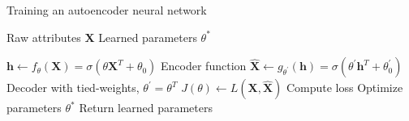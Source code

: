 %
%
%
%
%

\begin{algorithm}
    \caption{Training an autoencoder neural network}
    \label{algo:autoenc}
    \begin{algorithmic}[1]
    
    \INPUT Raw attributes $\mathbf{X}$
    \OUTPUT Learned parameters $\theta^{\ast}$

    \item[]
        \State $\mathbf{h} \gets f_{\theta}(\mathbf{X}) = \sigma(\theta\mathbf{X}^{T} + \theta_0)$
        \Comment Encoder function
        \State $\mathbf{\widehat{X}} \gets g_{\theta^{\prime}}(\mathbf{h}) = \sigma(\theta^{\prime} \mathbf{h}^{T} + \theta^{\prime}_{0})$
        \Comment Decoder with tied-weights, $\theta^{\prime}=\theta^{T}$
        \State $J(\theta) \gets L(\mathbf{X}, \mathbf{\widehat{X}})$
        \Comment Compute loss
        \State {}
        \Comment Optimize parameters
    \EndFor
    \State \Return $\theta^{\ast}$
    \Comment Return learned parameters
    \end{algorithmic}
\end{algorithm}